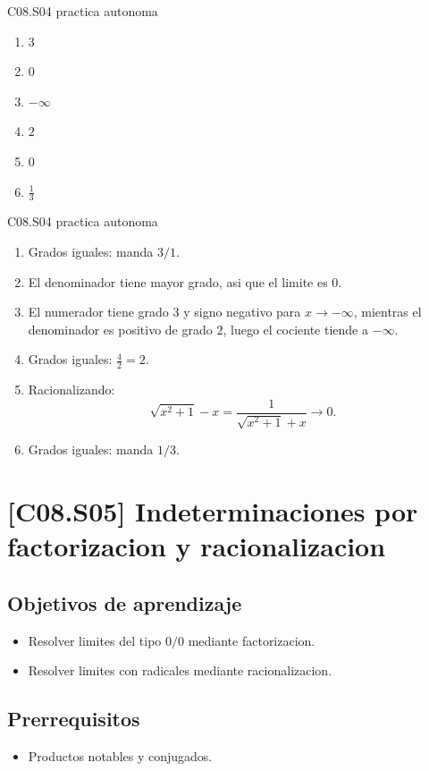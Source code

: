 \begin{shortanswer}{C08.S04 practica autonoma}
\begin{enumerate}[label=\textbf{PX-C08.S04-\arabic*:}, leftmargin=*]
  \item \(3\)
  \item \(0\)
  \item \(-\infty\)
  \item \(2\)
  \item \(0\)
  \item \(\frac{1}{3}\)
\end{enumerate}
\end{shortanswer}

\begin{fullsolution}{C08.S04 practica autonoma}
\begin{enumerate}[label=\textbf{PX-C08.S04-\arabic*:}, leftmargin=*]
  \item Grados iguales: manda \(3/1\).
  \item El denominador tiene mayor grado, asi que el limite es \(0\).
  \item El numerador tiene grado \(3\) y signo negativo para \(x\to-\infty\), mientras el
  denominador es positivo de grado \(2\), luego el cociente tiende a \(-\infty\).
  \item Grados iguales: \(\frac{4}{2}=2\).
  \item Racionalizando:
  \[
  \sqrt{x^2+1}-x=\frac{1}{\sqrt{x^2+1}+x}\to 0.
  \]
  \item Grados iguales: manda \(1/3\).
\end{enumerate}
\end{fullsolution}

\section{[C08.S05] Indeterminaciones por factorizacion y racionalizacion}

\subsection*{Objetivos de aprendizaje}
\begin{itemize}
  \item Resolver limites del tipo \(0/0\) mediante factorizacion.
  \item Resolver limites con radicales mediante racionalizacion.
\end{itemize}

\subsection*{Prerrequisitos}
\begin{itemize}
  \item Productos notables y conjugados.
\end{itemize}

